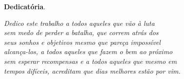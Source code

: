 \begin{dedicatoria}
   \vspace*{\fill}
   \centering
   \noindent
	\textbf{Dedicatória}.

   \textit{
   	 Dedico este trabalho a todos aqueles que vão à luta \\
   	sem medo de perder a batalha, que correm atrás dos  \\
   	seus sonhos e objetivos mesmo que pareça impossível \\
   	alcança-los, a todos aqueles que fazem o bem ao próximo \\
   	sem esperar recompensas e a todos aqueles que mesmo em \\
   	tempos difíceis, acreditam que dias melhores estão por vim.} \vspace*{\fill}
\end{dedicatoria}
